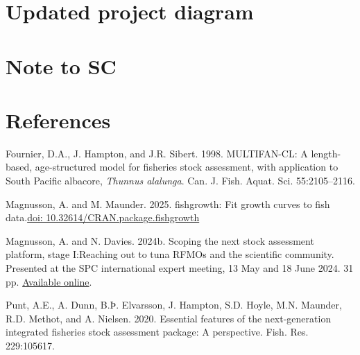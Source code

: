 \documentclass{SCreport}
\newcommand\blob
{https://github.com/PacificCommunity/ofp-sam-transition-plan/blob/main}
\newcommand\present{\blob/presentations}
\begin{document}
\section{Updated project diagram}

\section{Note to SC}

\section{References}

\sloppy\setlength{}

\begin{description}\setlength\itemsep{0ex}
  \item Fournier, D.A., J. Hampton, and J.R. Sibert. 1998. MULTIFAN-CL: A
  length-based, age-structured model for fisheries stock assessment, with
  application to South Pacific albacore, \textit{Thunnus alalunga}. Can. J.
  Fish. Aquat. Sci. 55:2105--2116.
  \item Magnusson, A. and M. Maunder. 2025. fishgrowth: Fit growth curves to
  fish data.\linebreak \href{https://doi.org/10.32614/CRAN.package.fishgrowth}
  {doi: 10.32614/CRAN.package.fishgrowth}
  \item Magnusson, A. and N. Davies. 2024b. Scoping the next stock assessment
  platform, stage I:\linebreak Reaching out to tuna RFMOs and the scientific
  community. Presented at the SPC international expert meeting, 13 May and 18
  June 2024. 31 pp.
  \href{\present/2024_05_13_experts_scoping/2024_05_13_experts_scoping.pdf}
  {Available online}.
  \item Punt, A.E., A. Dunn, B.Þ. Elvarsson, J. Hampton, S.D. Hoyle, M.N.
  Maunder, R.D. Methot, and A. Nielsen. 2020. Essential features of the
  next-generation integrated fisheries stock assessment package: A perspective.
  Fish. Res. 229:105617.
\end{description}
\end{document}
